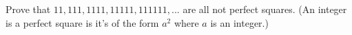   Prove that $11, 111, 1111, 11111, 111111, ...$ are all
  not perfect squares.
  (An integer is a perfect square is it's of the form
  $a^2$ where $a$ is an integer.)
